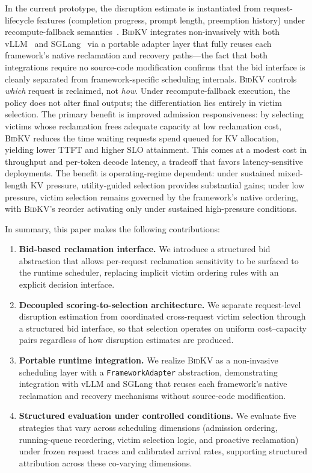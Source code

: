 \documentclass[conference]{IEEEtran}
\newcommand{\bidkv}{\textsc{BidKV}\xspace}
\begin{document}
In the current prototype, the disruption estimate is instantiated from
request-lifecycle features (completion progress, prompt length, preemption
history) under recompute-fallback semantics~\cite{Kwon2023}.
\bidkv integrates non-invasively with both vLLM~\cite{Kwon2023} and
SGLang~\cite{Zheng2024sglang} via a portable adapter layer that fully reuses
each framework's native reclamation and recovery paths---the fact that both
integrations require no source-code modification confirms that the bid
interface is cleanly separated from framework-specific scheduling internals.
\bidkv controls \emph{which} request is reclaimed, not \emph{how}.  Under
recompute-fallback execution, the policy does not alter final outputs; the
differentiation lies entirely in victim selection.  The primary benefit is
improved admission responsiveness: by selecting victims whose reclamation
frees adequate capacity at low reclamation cost, \bidkv reduces the time
waiting requests spend queued for KV allocation, yielding lower TTFT and
higher SLO attainment.  This comes at a modest cost in throughput and
per-token decode latency, a tradeoff that favors latency-sensitive
deployments.  The benefit is operating-regime dependent: under sustained
mixed-length KV pressure, utility-guided selection provides substantial
gains; under low pressure, victim selection remains governed by the
framework's native ordering, with \bidkv's reorder activating only under
sustained high-pressure conditions.


In summary, this paper makes the following contributions:
\begin{enumerate}
\item \textbf{Bid-based reclamation interface.}
  We introduce a structured bid abstraction that allows per-request
  reclamation sensitivity to be surfaced to the runtime scheduler, replacing
  implicit victim ordering rules with an explicit decision interface.

\item \textbf{Decoupled scoring-to-selection architecture.}
  We separate request-level disruption estimation from coordinated
  cross-request victim selection through a structured bid interface,
  so that selection operates on uniform cost--capacity pairs regardless
  of how disruption estimates are produced.

\item \textbf{Portable runtime integration.}
  We realize \bidkv as a non-invasive scheduling layer with a
  \texttt{Framework\-Adapter} abstraction, demonstrating integration with
  vLLM and SGLang that reuses each framework's native reclamation and
  recovery mechanisms without source-code modification.

\item \textbf{Structured evaluation under controlled conditions.}
  We evaluate five strategies that vary across scheduling dimensions
  (admission ordering, running-queue reordering, victim selection logic,
  and proactive reclamation) under frozen request traces and calibrated
  arrival rates, supporting structured attribution across these co-varying
  dimensions.
\end{enumerate}
\end{document}
